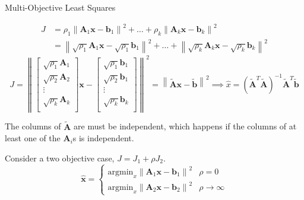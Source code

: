 \documentclass[aspectratio=169]{beamer}
\begin{document}
\begin{frame}[t]{Multi-Objective Least Squares}
\begin{small}
    \[ \begin{split}
    J & = \rho_1\left\lVert \mathbf{A}_1\mathbf{x} - \mathbf{b}_1 \right\rVert^2 + \ldots + \rho_k\left\lVert \mathbf{A}_k\mathbf{x} - \mathbf{b}_k \right\rVert^2 \\
     & = \left\lVert \sqrt{\rho_1}\mathbf{A}_1\mathbf{x} - \sqrt{\rho_1}\mathbf{b}_1 \right\rVert^2 + \ldots + \left\lVert \sqrt{\rho_k}\mathbf{A}_k\mathbf{x} - \sqrt{\rho_k}\mathbf{b}_k \right\rVert^2
    \end{split}
    \]
    \[ J = \left\lVert 
    \begin{bmatrix*}\sqrt{\rho_1}\mathbf{A}_1\\\sqrt{\rho_2}\mathbf{A}_2\\\vdots\\\sqrt{\rho_k}\mathbf{A}_k\\\end{bmatrix*}\mathbf{x} - \begin{bmatrix*}\sqrt{\rho_1}\mathbf{b}_1\\\sqrt{\rho_2}\mathbf{b}_1\\\vdots\\\sqrt{\rho_k}\mathbf{b}_k\\\end{bmatrix*}\right\rVert^2
    = \left\lVert \mathbf{\tilde{A}}\mathbf{x} - \mathbf{\tilde{b}}\right\rVert^2
    \implies \hat{x} = \left(\mathbf{\tilde{A}}^T\mathbf{\tilde{A}}\right)^{-1}\mathbf{\tilde{A}}^T\mathbf{\tilde{b}}
    \]

    The columns of $\mathbf{\tilde{A}}$ are must be independent, which happens if the columns of at least one of the $\mathbf{A}_i$s is independent.

    Consider a two objective case, $J = J_1 + \rho J_2$.
    \[ \hat{\mathbf{x}} = \begin{cases}
    \mathrm{argmin}_x \left\lVert \mathbf{A}_1\mathbf{x} - \mathbf{b}_1\right\rVert^2 & \rho = 0\\
    \mathrm{argmin}_x \left\lVert \mathbf{A}_2\mathbf{x} - \mathbf{b}_2\right\rVert^2 & \rho \rightarrow \infty 
    \end{cases}
    \]
    \end{small}
\end{frame}
\end{document}
